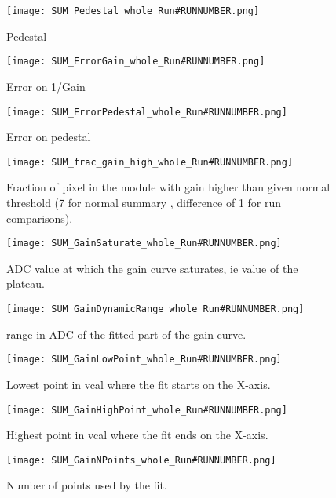 \documentclass[a4paper,10pt]{article}
\begin{document}
\begin{figure}[htp]
 \centering
\texttt{[image: SUM\_Pedestal\_whole\_Run\#RUNNUMBER.png]}
\caption{Pedestal}
\end{figure}


\begin{figure}[htp]
 \centering
\texttt{[image: SUM\_ErrorGain\_whole\_Run\#RUNNUMBER.png]}
\caption{Error on 1/Gain}
\end{figure}


\begin{figure}[htp]
 \centering
\texttt{[image: SUM\_ErrorPedestal\_whole\_Run\#RUNNUMBER.png]}
\caption{Error on pedestal}
\end{figure}

\begin{figure}[htp]
 \centering
  \texttt{[image: SUM\_frac\_gain\_high\_whole\_Run\#RUNNUMBER.png]}
\caption{Fraction of pixel in the module with gain higher than given normal threshold (7 for normal summary , difference of 1
for run comparisons).}
\end{figure}

\begin{figure}[htp]
 \centering
  \texttt{[image: SUM\_GainSaturate\_whole\_Run\#RUNNUMBER.png]}
\caption{ADC value at which the gain curve saturates, ie value of the plateau.}
\end{figure}

\begin{figure}[htp]
 \centering
  \texttt{[image: SUM\_GainDynamicRange\_whole\_Run\#RUNNUMBER.png]}
\caption{range in ADC of the fitted part of the gain curve.}
\end{figure}

\begin{figure}[htp]
 \centering
  \texttt{[image: SUM\_GainLowPoint\_whole\_Run\#RUNNUMBER.png]}
\caption{Lowest point in vcal where the fit starts on the X-axis.}
\end{figure}


\begin{figure}[htp]
 \centering
  \texttt{[image: SUM\_GainHighPoint\_whole\_Run\#RUNNUMBER.png]}
\caption{Highest point in vcal where the fit ends on the X-axis.}
\end{figure}


\begin{figure}[htp]
 \centering
  \texttt{[image: SUM\_GainNPoints\_whole\_Run\#RUNNUMBER.png]}
\caption{Number of points used by the fit.}
\end{figure}
\end{document}
